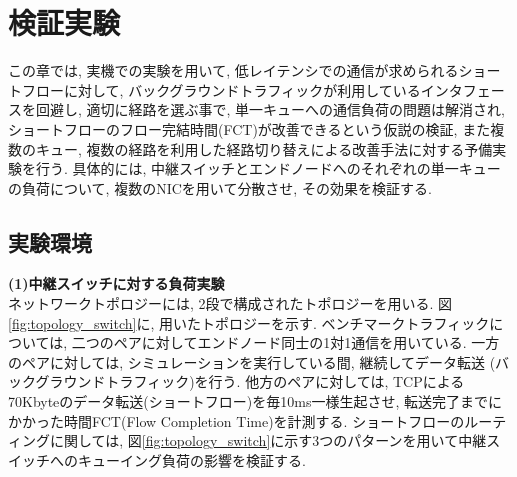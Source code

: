 \section{検証実験}
\label{sec:verification}
この章では, 実機での実験を用いて, 低レイテンシでの通信が求められるショートフローに対して, バックグラウンドトラフィックが利用しているインタフェースを回避し,
適切に経路を選ぶ事で, 単一キューへの通信負荷の問題は解消され,
ショートフローのフロー完結時間(FCT)が改善できるという仮説の検証, また複数のキュー,
複数の経路を利用した経路切り替えによる改善手法に対する予備実験を行う.
具体的には, 中継スイッチとエンドノードへのそれぞれの単一キューの負荷について, 複数のNICを用いて分散させ, その効果を検証する.

\subsection{実験環境}
{\bf (1)中継スイッチに対する負荷実験}\\
ネットワークトポロジーには, 2段で構成されたトポロジーを用いる.
図\ref{fig:topology_switch}に, 用いたトポロジーを示す.
ベンチマークトラフィックについては, 二つのペアに対してエンドノード同士の1対1通信を用いている.
一方のペアに対しては, シミュレーションを実行している間, 継続してデータ転送 (バックグラウンドトラフィック)を行う.
他方のペアに対しては, TCPによる70Kbyteのデータ転送(ショートフロー)を毎10ms一様生起させ,
転送完了までにかかった時間FCT(Flow Completion Time)を計測する.
ショートフローのルーティングに関しては,
図\ref{fig:topology_switch}に示す3つのパターンを用いて中継スイッチへのキューイング負荷の影響を検証する.


